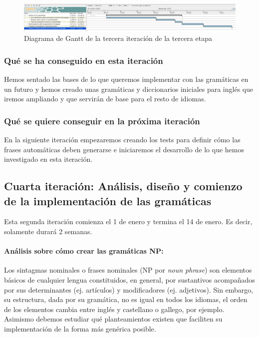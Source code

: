 \begin{figure}
    \includegraphics[width=\textwidth,height=\textheight,keepaspectratio]{./img/sec3it3.png}
  \caption{Diagrama de Gantt de la tercera iteración de la tercera etapa}
  \label{fig:sec3it3}
\end{figure}

\subsubsection{Qué se ha conseguido en esta iteración}

Hemos sentado las bases de lo que queremos implementar con las gramáticas en un futuro y hemos creado unas gramáticas y diccionarios iniciales para inglés que iremos ampliando y que servirán de base para el resto de idiomas.

\subsubsection{Qué se quiere conseguir en la próxima iteración}

En la siguiente iteración empezaremos creando los tests para definir cómo las frases automáticas deben generarse e iniciaremos el desarrollo de lo que hemos investigado en esta iteración.

\subsection{Cuarta iteración: Análisis, diseño y comienzo de la implementación de las gramáticas}

Esta segunda iteración comienza el 1 de enero y termina el 14 de enero. Es decir, solamente durará 2 semanas.

\paragraph{Análisis sobre cómo crear las gramáticas NP:} Los sintagmas nominales o frases nominales (NP por \emph{noun phrase}) son elementos básicos de cualquier lengua constituidos, en general, por sustantivos acompañados por sus determinantes (ej. artículos) y modificadores (ej. adjetivos). Sin embargo, su estructura, dada por su gramática, no es igual en todos los idiomas, el orden de los elementos cambia entre inglés y castellano o gallego, por ejemplo. Asimismo debemos estudiar qué planteamientos existen que faciliten su implementación de la forma más genérica posible.

